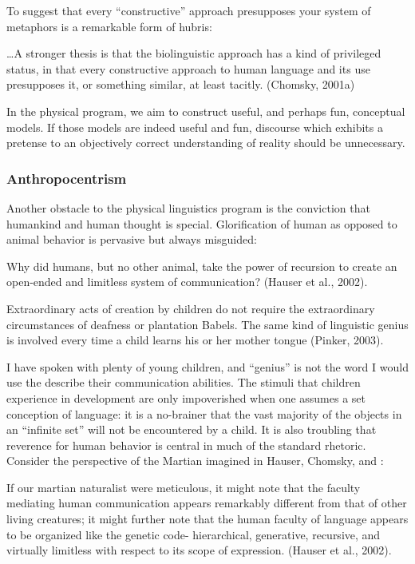 To suggest that every “constructive” approach presupposes your system of metaphors is a remarkable form of hubris:

…A stronger thesis is that the biolinguistic approach has a kind of privileged status, in that every constructive approach to human language and its use presupposes it, or something similar, at least tacitly. (Chomsky, 2001a)

  In the physical program, we aim to construct useful, and perhaps fun, conceptual models. If those models are indeed useful and fun, discourse which exhibits a pretense to an objectively correct understanding of reality should be unnecessary.

\subsubsection{Anthropocentrism}

Another obstacle to the physical linguistics program is the conviction that humankind and human thought is special. Glorification of human as opposed to animal behavior is pervasive but always misguided:

Why did humans, but no other animal, take the power of recursion to create an open-ended and limitless system of communication? (Hauser et al., 2002).

Extraordinary acts of creation by children do not require the extraordinary circumstances of deafness or plantation Babels. The same kind of linguistic genius is involved every time a child learns his or her mother tongue (Pinker, 2003).

  I have spoken with plenty of young children, and “genius” is not the word I would use the describe their communication abilities. The stimuli that children experience in development are only impoverished when one assumes a set conception of language: it is a no-brainer that the vast majority of the objects in an “infinite set” will not be encountered by a child. It is also troubling that reverence for human behavior is central in much of the standard rhetoric. Consider the perspective of the Martian imagined in Hauser, Chomsky, and \citet{Fitch2002}:

If our martian naturalist were meticulous, it might note that the faculty mediating human communication appears remarkably different from that of other living creatures; it might further note that the human faculty of language appears to be organized like the genetic code- hierarchical, generative, recursive, and virtually limitless with respect to its scope of expression. (Hauser et al., 2002).

